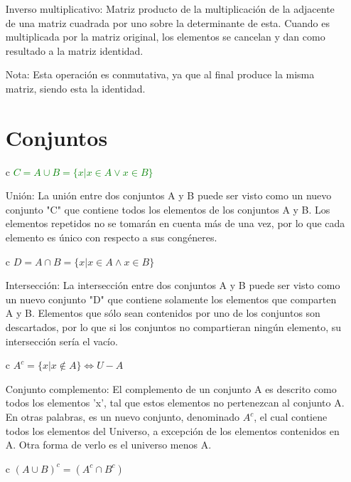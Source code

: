 \documentclass[letterpaper, 12pt]{article}
\begin{document}
\begin{itemize}
    Inverso multiplicativo: Matriz producto de la multiplicaci\'on de la adjacente de una matriz cuadrada por uno sobre la determinante de esta. Cuando es multiplicada por la matriz original, los elementos se cancelan y dan como resultado a la matriz identidad. \newline
    
    Nota: Esta operaci\'on es conmutativa, ya que al final produce la misma matriz, siendo esta la identidad. \newpage
    
\section{Conjuntos}
    \item[c] \textcolor{green}{$C = A \cup B = \{x | x\in A \lor x\in B\}$} \newline

    Uni\'on: La uni\'on entre dos conjuntos A y B puede ser visto como un nuevo conjunto "C" que contiene todos  los elementos de los conjuntos A y B. Los elementos repetidos no se tomar\'an en cuenta m\'as de una vez, por lo que cada elemento es \'unico con respecto a sus cong\'eneres. \newline
    
    \item[c] $ D = A \cap B = \{x | x\in A \land x\in B\}$

    Intersecci\'on: La intersecci\'on entre dos conjuntos A y B puede ser visto como un nuevo conjunto "D" que contiene solamente los elementos que comparten A y B. Elementos que s\'olo sean contenidos por uno de los conjuntos son descartados, por lo que si los conjuntos no compartieran ning\'un elemento, su intersecci\'on ser\'ia el vac\'io. \newline
    
    \item[c] $A^c = \{x|x\notin A\} \Leftrightarrow U - A$ \newline

    Conjunto complemento: El complemento de un conjunto A es descrito como todos los elementos 'x', tal que estos elementos no pertenezcan al conjunto A. En otras palabras, es un nuevo conjunto, denominado $A^c$, el cual contiene todos los elementos del Universo, a excepci\'on de los elementos contenidos en A. Otra forma de verlo es el universo menos A. \newline
    
    \item[c] $(A \cup B)^c = (A^c \cap B^c)$ \newline


\end{itemize}
\end{document}
